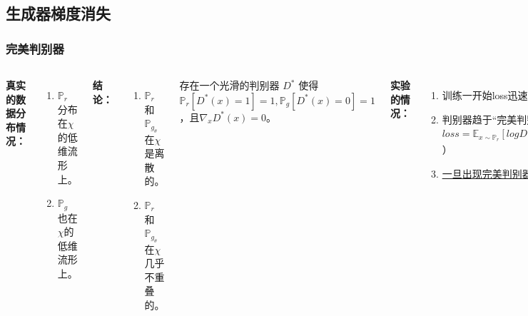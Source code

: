 \documentclass[xelatex]{beamer}
\begin{document}
\subsection{生成器梯度消失}
\begin{frame}
\frametitle{完美判别器}
\begin{columns}[t]
    \textbf{真实的数据分布情况：} \\
    \begin{enumerate}
      \item $\mathbb{P}_r$分布在$\chi$的低维流形上。
      \item $\mathbb{P}_g$也在$\chi$的低维流形上。
    \end{enumerate}
    \vspace{3mm}
    \textbf{结论：} \\
    \begin{enumerate}
      \item $\mathbb{P}_r$和$\mathbb{P}_{g_\theta}$在$\chi$是离散的。
      \item $\mathbb{P}_r$和$\mathbb{P}_{g_\theta}$在$\chi$几乎不重叠的。
    \end{enumerate}
    \begin{theorem}[完美判别器]
      存在一个光滑的判别器 $D^*$ 使得$\mathbb{P}_r[D^*(x) = 1] = 1,\mathbb{P}_g[D^*(x) = 0] = 1$，且$\nabla_xD^*(x) = 0$。
    \end{theorem}

    \textbf{实验的情况：} \\
      \begin{enumerate}
        \item 训练一开始loss迅速降为0。
        \vspace{2mm}
        \item 判别器趋于“完美判别器”，由$loss = \mathbb{E}_{x \sim \mathbb{P}_r}[logD(x)] + \mathbb{E}_{x \sim \mathbb{P}_g}[log(1-D(x))]$）
        \vspace{2mm}
        \item \uline{一旦出现完美判别器情况，就无法训练。}
      \end{enumerate}
  \end{columns}

\end{frame}
\end{document}
